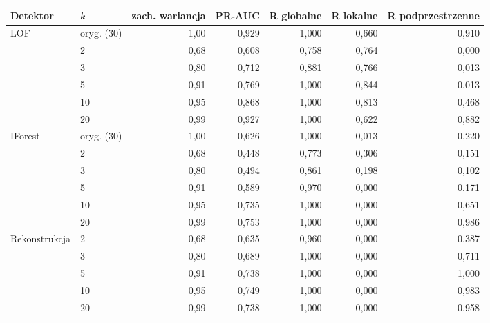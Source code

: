 \begin{tabular}{llrrrrr}
\toprule
Detektor & $k$ & zach. wariancja & PR-AUC & R globalne & R lokalne & R podprzestrzenne \\
\midrule
LOF & oryg. (30) & 1,00 & 0,929 & 1,000 & 0,660 & 0,910 \\
 & 2 & 0,68 & 0,608 & 0,758 & 0,764 & 0,000 \\
 & 3 & 0,80 & 0,712 & 0,881 & 0,766 & 0,013 \\
 & 5 & 0,91 & 0,769 & 1,000 & 0,844 & 0,013 \\
 & 10 & 0,95 & 0,868 & 1,000 & 0,813 & 0,468 \\
 & 20 & 0,99 & 0,927 & 1,000 & 0,622 & 0,882 \\
IForest & oryg. (30) & 1,00 & 0,626 & 1,000 & 0,013 & 0,220 \\
 & 2 & 0,68 & 0,448 & 0,773 & 0,306 & 0,151 \\
 & 3 & 0,80 & 0,494 & 0,861 & 0,198 & 0,102 \\
 & 5 & 0,91 & 0,589 & 0,970 & 0,000 & 0,171 \\
 & 10 & 0,95 & 0,735 & 1,000 & 0,000 & 0,651 \\
 & 20 & 0,99 & 0,753 & 1,000 & 0,000 & 0,986 \\
Rekonstrukcja & 2 & 0,68 & 0,635 & 0,960 & 0,000 & 0,387 \\
 & 3 & 0,80 & 0,689 & 1,000 & 0,000 & 0,711 \\
 & 5 & 0,91 & 0,738 & 1,000 & 0,000 & 1,000 \\
 & 10 & 0,95 & 0,749 & 1,000 & 0,000 & 0,983 \\
 & 20 & 0,99 & 0,738 & 1,000 & 0,000 & 0,958 \\
\bottomrule
\end{tabular}
